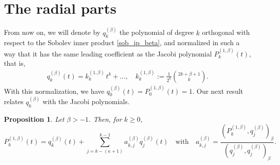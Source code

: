 \documentclass{amsart}
\theoremstyle{plain}%
\newtheorem{prop}[thm]{Proposition}
\theoremstyle{definition}
\theoremstyle{remark}
\begin{document}
\section{The radial parts}
\setcounter{equation}{0}

From now on, we will denote by \(q_{k}^{(\beta)}\) the polynomial of degree \(k\) 
orthogonal with respect to the Sobolev inner product \eqref{sob_ip_beta},
and normalized in such a way that it has the same leading coefficient as the Jacobi polynomial $P_k^{(1,\beta)}(t)$, that is,
\begin{align}\label{qk-defn}
   q_{k}^{(\beta)}(t) = k^{(1, \beta)}_k\, t^k + \ldots, 
      \quad k_k^{(1,\beta)} := \frac{1}{2^k} \binom{2k + \beta + 1}{k}. 
\end{align}
With this normalization, we have $q_{0}^{(\beta)}(t) = P_{0}^{(1,\beta)}(t)= 1$.  
Our next result relates $q_k^{(\beta)}$ with the Jacobi polynomials.

\begin{prop}
Let \(\beta >-1\). Then, for $k\ge 0$, 
\begin{equation} \label{connect_qj}
P_{k}^{(1, \beta)}(t) = q_k^{(\beta)}(t) + \sum_{j=k-(\kappa+1)}^{k-1}  a^{(\beta)}_{k,j} q_j^{(\beta)}(t) \quad \text{with}\quad
    a^{(\beta)}_{k,j} = \frac{(P_{k}^{(1, \beta)}, q_j^{(\beta)})_{\beta} } { (q_{j}^{(\beta)},q_{j}^{(\beta)})_{\beta} }.
\end{equation}
\end{prop}
\end{document}
